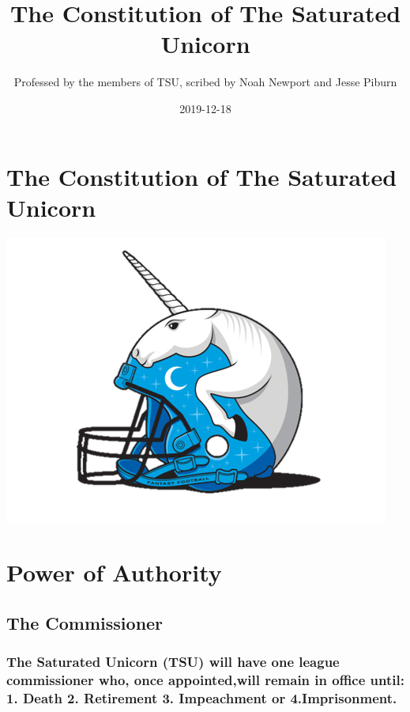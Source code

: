 \documentclass[]{book}
\title{The Constitution of The Saturated Unicorn}
\author{Professed by the members of TSU, scribed by Noah Newport and Jesse Piburn}
\date{2019-12-18}
\begin{document}
\maketitle

{
\setcounter{tocdepth}{1}
\tableofcontents
}
\hypertarget{the-constitution-of-the-saturated-unicorn}{%
\chapter*{The Constitution of The Saturated Unicorn}\label{the-constitution-of-the-saturated-unicorn}}

\includegraphics[width=1\linewidth]{images/tsu-logo}

\hypertarget{power-of-authority}{%
\chapter{Power of Authority}\label{power-of-authority}}

\hypertarget{the-commissioner}{%
\section{The Commissioner}\label{the-commissioner}}

\hypertarget{the-saturated-unicorn-tsu-will-have-one-league-commissioner-who-once-appointedwill-remain-in-office-until-1.-death-2.-retirement-3.-impeachment-or-4.imprisonment.}{%
\subsection{The Saturated Unicorn (TSU) will have one league commissioner who, once appointed,will remain in office until: 1. Death 2. Retirement 3. Impeachment or 4.Imprisonment.}\label{the-saturated-unicorn-tsu-will-have-one-league-commissioner-who-once-appointedwill-remain-in-office-until-1.-death-2.-retirement-3.-impeachment-or-4.imprisonment.}}
\end{document}

